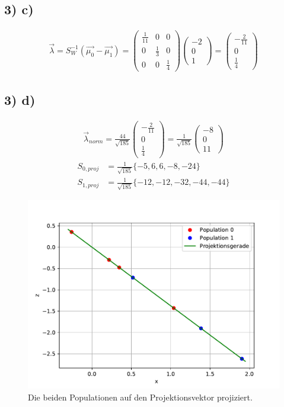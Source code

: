 \subsection*{3) c)}
\begin{align*}
  \vec{\lambda} = S_W^{-1}(\vec{\mu_0}-\vec{\mu_1}) = \begin{pmatrix} \frac{1}{11}&0&0\\ 0&\frac{1}{3}&0\\ 0&0&\frac{1}{4}\end{pmatrix} \begin{pmatrix}-2 \\ 0 \\ 1 \end{pmatrix} = \begin{pmatrix} -\frac{2}{11} \\ 0 \\ \frac{1}{4} \end{pmatrix}
\end{align*}



\subsection*{3) d)}
\begin{align*}
  \vec{\lambda}_{norm} = \frac{44}{\sqrt{185}} \begin{pmatrix} -\frac{2}{11} \\ 0 \\ \frac{1}{4} \end{pmatrix} = \frac{1}{\sqrt{185}}  \begin{pmatrix} -8 \\ 0 \\ 11 \end{pmatrix}
\end{align*}
\begin{align*}
  S_{0,proj} &= \frac{1}{\sqrt{185}} \{-5, 6, 6, -8, -24\} \\
  S_{1,proj} &= \frac{1}{\sqrt{185}} \{-12, -12, -32, -44, -44\}
\end{align*}

\begin{figure}[H]
  \includegraphics[width=\linewidth]{Python/Aufgabe3d.pdf}
  \caption{Die beiden Populationen auf den Projektionsvektor projiziert.}
\end{figure}
